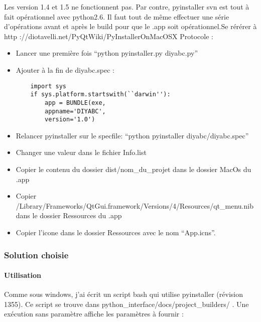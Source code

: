 \documentclass[12pt,a4paper]{article}
\begin{document}
        Les version 1.4 et 1.5 ne fonctionnent pas. Par contre, pyinstaller svn
        est tout à fait op\'erationnel avec python2.6. Il faut tout de même
        effectuer une s\'erie d'op\'erations avant et après le build pour que le
        .app soit op\'erationnel.Se r\'er\'erer à \newline http
        ://diotavelli.net/PyQtWiki/PyInstallerOnMacOSX \newline
        Protocole : \\

        \label{mac_pyinstaller}
        \begin{itemize}
            \item Lancer une première fois ``python pyinstaller.py diyabc.py''
            \item Ajouter à la fin de diyabc.spec :
        \begin{verbatim}
    import sys 
    if sys.platform.startswith(``darwin''): 
        app = BUNDLE(exe, 
        appname='DIYABC', 
        version='1.0')
        \end{verbatim}
            \item Relancer pyinstaller sur le specfile: ``python pyinstaller diyabc/diyabc.spec''
            \item Changer une valeur dans le fichier Info.list
            \item Copier le contenu du dossier dist/nom\_du\_projet dans le dossier MacOs du .app
            \item Copier /Library/Frameworks/QtGui.framework/Versions/4/Resources/qt\_menu.nib dans le dossier Ressources du .app
            \item Copier l'icone dans le dossier Ressources avec le nom ``App.icns''.\\
        \end{itemize}

        \subsubsection{Solution choisie}
        \paragraph{Utilisation}

        Comme sous windows, j'ai écrit un script bash qui utilise pyinstaller
        (révision 1355). Ce script se trouve dans
        python\_interface/docs/project\_builders/ .  Une exécution sans
        paramètre affiche les paramètres à fournir : \\
\end{document}
